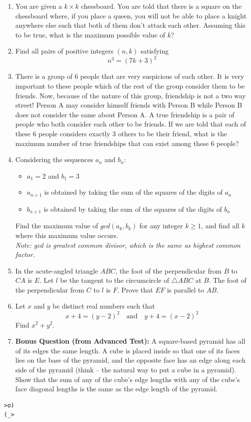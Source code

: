 \documentclass{article}
\begin{document}
\begin{enumerate}[1.]
\item %
You are given a ${k\times k}$ chessboard. You are told that there is a square on the chessboard where, if you place a queen, you will not be able to place a knight anywhere else such that both of them don't attack each other. Assuming this to be true, what is the maximum possible value of $k$?


\item %
Find all pairs of positive integers $(n,k)$ satisfying $$n^3=(7k+3)^2$$


\item %
There is a group of 6 people that are very suspicious of each other. It is very important to these people which of the rest of the group consider them to be friends. Now, because of the nature of this group, friendship is not a two way street! Person A may consider himself friends with Person B while Person B does not consider the same about Person A. A true friendship is a pair of people who both consider each other to be friends. If we are told that each of these 6 people considers exactly 3 others to be their friend, what is the maximum number of true friendships that can exist among these 6 people?


\item %
Considering the sequences $a_n$ and $b_n$:
\begin{itemize}
\item $a_1=2$ and $b_1=3$
\item $a_{n+1}$ is obtained by taking the sum of the squares of the digits of $a_{n}$
\item $b_{n+1}$ is obtained by taking the sum of the squares of the digits of $b_n$
\end{itemize}
Find the maximum value of $gcd(a_k,b_k)$ for any integer $k\geq 1$, and find all $k$ where this maximum value occurs.\\
\textit{Note: gcd is greatest common divisor, which is the same as highest common factor.}


\item %
In the acute-angled triangle $ABC$, the foot of the perpendicular from $B$ to $CA$ is $E$. Let $l$ be the tangent to the circumcircle of $\triangle ABC$ at $B$. The foot of the perpendicular from $C$ to $l$ is $F$. Prove that $EF$ is parallel to $AB$.


\item %
Let $x$ and $y$ be distinct real numbers such that $$x + 4 = (y - 2)^2 \quad\text{and}\quad y + 4 = (x - 2)^2$$
Find $x^2 + y^2$.

\item %
\textbf{Bonus Question (from Advanced Test):}
A square-based pyramid has all of its edges the same length.
A cube is placed inside so that one of its faces lies on the base of the pyramid, and the opposite face has an edge along each side of the pyramid (think -- the natural way to put a cube in a pyramid).
Show that the sum of any of the cube's edge lengths with any of the cube's face diagonal lengths is the same as the edge length of the pyramid.


\end{enumerate}


\vfill
\centering
\begin{BVerbatim}
>o)
(_>
\end{BVerbatim}
\end{document}
